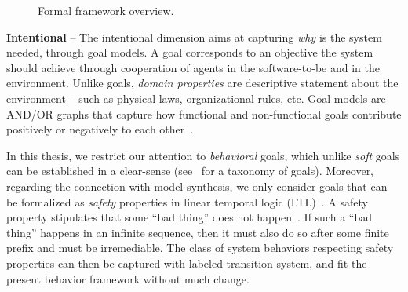 \begin{figure}\centering
  \caption{Formal framework overview.\label{image:framework}}
\end{figure}

\noindent \textbf{Intentional} -- The intentional dimension aims at capturing \emph{why} is the system needed, through goal models. A goal corresponds to an objective the system should achieve through cooperation of agents in the software-to-be and in the environment. Unlike goals, \emph{domain properties} are descriptive statement about the environment -- such as physical laws, organizational rules, etc. Goal models are AND/OR graphs that capture how functional and non-functional goals contribute positively or negatively to each other~\cite{VanLamsweerde:2000, VanLamsweerde:2004}.

In this thesis, we restrict our attention to \emph{behavioral} goals, which unlike \emph{soft} goals can be established in a clear-sense (see~\cite{VanLamsweerde:2009} for a taxonomy of goals). Moreover, regarding the connection with model synthesis, we only consider goals that can be formalized as \emph{safety} properties in linear temporal logic (LTL)~\cite{Manna:1992}. A safety property stipulates that some ``bad thing'' does not happen~\cite{Alpern:1986}. If such a ``bad thing'' happens in an infinite sequence, then it must also do so after some finite prefix and must be irremediable. The class of system behaviors respecting safety properties can then be captured with labeled transition system, and fit the present behavior framework without much change.

